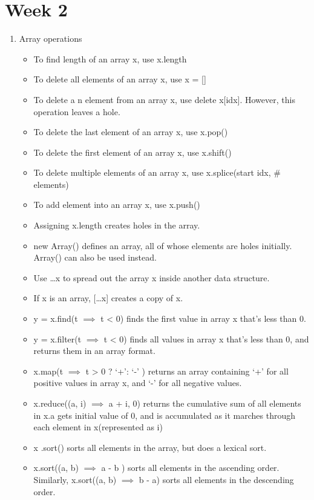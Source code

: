 \documentclass[a4paper]{article}
\begin{document}
\section{Week 2}
\begin{enumerate}
    \item Array operations
    \begin{itemize}
    \item To find length of an array x, use x.length
    \item To delete all elements of an array x, use x = []
    \item To delete a n element from an array x, use delete x[idx]. However, this operation leaves a hole.
    \item To delete the last element of an array x, use x.pop()
    \item To delete the first element of an array x, use x.shift()
    \item To  delete multiple elements of an array x, use x.splice(start idx, $\#$elements)
    \item To add element into an array x, use x.push()
    \item Assigning x.length  creates holes in the array.
    \item new Array() defines an array, all of whose elements are holes initially. Array()  can also be used instead.
    \item Use …x to spread out the array x inside another data structure.
    \item If x is an array, […x] creates a copy of x.
    \item y = x.find(t $\implies$ t < 0) finds the first value in array x that’s less than 0.
    \item y = x.filter(t $\implies$ t < 0) finds all values in array x that’s less than 0, and returns them in an array format.
    \item x.map(t $\implies$ t > 0 ? ‘+’: ‘-’ ) returns an array containing ‘+’ for all positive values in array x, and ‘-’ for all negative values.
    \item x.reduce((a, i) $\implies$ a + i, 0) returns the cumulative sum of all elements in x.a  gets initial value of 0, and is accumulated as it marches through each element in x(represented as i)
    \item x .sort() sorts all elements in the array, but does a lexical sort.
    \item x.sort((a, b) $\implies$ a - b ) sorts all elements in the ascending order. Similarly, x.sort((a, b) $\implies$ b  -  a)  sorts all elements in the descending order.

\end{itemize}
\end{enumerate}
\end{document}

